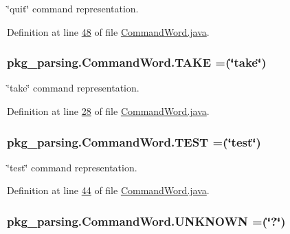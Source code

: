 \char`\"{}quit\char`\"{} command representation. 



Definition at line \hyperlink{CommandWord_8java_source_l00048}{48} of file \hyperlink{CommandWord_8java_source}{Command\-Word.\-java}.

\hypertarget{enumpkg__parsing_1_1CommandWord_ae5353500b91f141ae399403b5e87cc28}{
\subsubsection[{T\-A\-K\-E}]{\setlength{\rightskip}{0pt plus 5cm}pkg\-\_\-parsing.\-Command\-Word.\-T\-A\-K\-E =(\char`\"{}take\char`\"{})}}\label{enumpkg__parsing_1_1CommandWord_ae5353500b91f141ae399403b5e87cc28}


\char`\"{}take\char`\"{} command representation. 



Definition at line \hyperlink{CommandWord_8java_source_l00028}{28} of file \hyperlink{CommandWord_8java_source}{Command\-Word.\-java}.

\hypertarget{enumpkg__parsing_1_1CommandWord_acf61cb32b4d651f87b2cd342761f9a79}{
\subsubsection[{T\-E\-S\-T}]{\setlength{\rightskip}{0pt plus 5cm}pkg\-\_\-parsing.\-Command\-Word.\-T\-E\-S\-T =(\char`\"{}test\char`\"{})}}\label{enumpkg__parsing_1_1CommandWord_acf61cb32b4d651f87b2cd342761f9a79}


\char`\"{}test\char`\"{} command representation. 



Definition at line \hyperlink{CommandWord_8java_source_l00044}{44} of file \hyperlink{CommandWord_8java_source}{Command\-Word.\-java}.

\hypertarget{enumpkg__parsing_1_1CommandWord_a7a089aad12d2934da530b785a3daab49}{
\subsubsection[{U\-N\-K\-N\-O\-W\-N}]{\setlength{\rightskip}{0pt plus 5cm}pkg\-\_\-parsing.\-Command\-Word.\-U\-N\-K\-N\-O\-W\-N =(\char`\"{}?\char`\"{})}}\label{enumpkg__parsing_1_1CommandWord_a7a089aad12d2934da530b785a3daab49}


